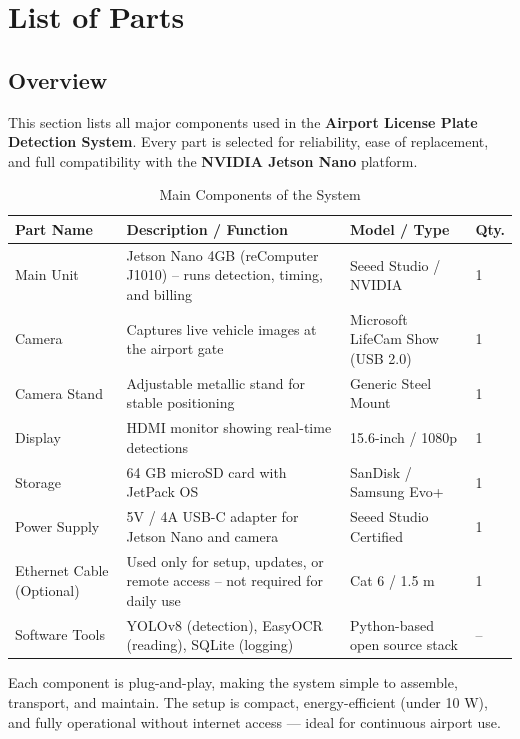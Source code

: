 %
%
%

\chapter{List of Parts}

\section{Overview}

This section lists all major components used in the \textbf{Airport License Plate Detection System}.  
Every part is selected for reliability, ease of replacement, and full compatibility with the \textbf{NVIDIA Jetson Nano} platform.

\vspace{0.4cm}
\begin{table}[h!]
	\centering
	\caption{Main Components of the System}
	\label{tab:listofparts}
	\renewcommand{\arraystretch}{1.2}
	\begin{tabular}{|p{3.2cm}|p{6.5cm}|p{3.2cm}|p{1.6cm}|}
		\hline
		\textbf{Part Name} & \textbf{Description / Function} & \textbf{Model / Type} & \textbf{Qty.} \\
		\hline
		Main Unit & Jetson Nano 4GB (reComputer J1010) – runs detection, timing, and billing & Seeed Studio / NVIDIA & 1 \\
		\hline	
		Camera & Captures live vehicle images at the airport gate & Microsoft LifeCam Show (USB 2.0) & 1 \\
		\hline
		Camera Stand & Adjustable metallic stand for stable positioning & Generic Steel Mount & 1 \\
		\hline
		Display & HDMI monitor showing real-time detections & 15.6-inch / 1080p & 1 \\
		\hline
		Storage & 64 GB microSD card with JetPack OS & SanDisk / Samsung Evo+ & 1 \\
		\hline
		Power Supply & 5V / 4A USB-C adapter for Jetson Nano and camera & Seeed Studio Certified & 1 \\
		\hline
		Ethernet Cable (Optional) & Used only for setup, updates, or remote access – not required for daily use & Cat 6 / 1.5 m & 1 \\
		\hline
		Software Tools & YOLOv8 (detection), EasyOCR (reading), SQLite (logging) & Python-based open source stack & -- \\
		\hline
	\end{tabular}
\end{table}

\vspace{0.4cm}
\noindent
Each component is plug-and-play, making the system simple to assemble, transport, and maintain.  
The setup is compact, energy-efficient (under 10 W), and fully operational without internet access — ideal for continuous airport use.